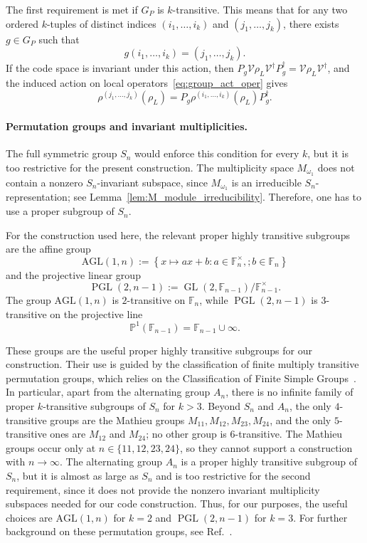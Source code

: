 \documentclass[10pt,twocolumn,superscriptaddress,aps,amsmath,amssymb,citeautoscript,floatfix,prx]{revtex4-2}
\theoremstyle{plain}
\theoremstyle{plain}
\theoremstyle{plain}
\theoremstyle{plain}
\theoremstyle{plain}
\theoremstyle{plain}
\theoremstyle{plain}
\theoremstyle{definition}
\theoremstyle{plain}
\begin{document}
The first requirement is met if $G_P$ is $k$-transitive. This means that for any two ordered $k$-tuples of distinct indices $(i_1,\ldots,i_k)$ and $(j_1,\ldots,j_k)$, 
there exists $g\in G_P$ such that
$$
g(i_1,\ldots,i_k)=(j_1,\ldots,j_k).
$$
If the code space is invariant under this action, then $P_g\mathcal{V}\rho_L\mathcal{V}^\dagger P_g^\dagger=\mathcal{V}\rho_L\mathcal{V}^\dagger$, 
and the induced action on local operators~\eqref{eq:group_act_oper} gives
$$
\rho^{(j_1,\ldots,j_k)}(\rho_L)
=
P_g
\rho^{(i_1,\ldots,i_k)}(\rho_L)
P_g^\dagger .
$$

\paragraph{Permutation groups and invariant multiplicities.}

The full symmetric group $S_n$ would enforce this condition for every $k$, but it is too restrictive for the present construction. 
The multiplicity space $M_{\omega_1}$ does not contain a nonzero $S_n$-invariant subspace, since $M_{\omega_1}$ is an irreducible $S_n$-representation; 
see Lemma~\ref{lem:M_module_irreducibility}. Therefore, one has to use a proper subgroup of $S_n$.

For the construction used here, the relevant proper highly transitive subgroups are the affine group
\begin{equation}\label{eq:AGL_def}
\mathrm{AGL}(1,n)
:=
\left\{
x\mapsto ax+b:
a\in\mathbb F_n^\times,;
b\in\mathbb F_n
\right\}
\end{equation}
and the projective linear group
\begin{equation}\label{eq:PGL_def}
\operatorname{PGL}(2,n-1)
:=
\operatorname{GL}\left(2,\mathbb F_{n-1}\right)
/\mathbb F_{n-1}^\times .
\end{equation}
The group $\mathrm{AGL}(1,n)$ is $2$-transitive on $\mathbb F_n$, while $\operatorname{PGL}(2,n-1)$ is $3$-transitive on the projective line
$$
\mathbb P^1(\mathbb F_{n-1})
=
\mathbb F_{n-1}\cup{\infty}.
$$

These groups are the useful proper highly transitive subgroups for our construction. 
Their use is guided by the classification of finite multiply transitive permutation groups, 
which relies on the Classification of Finite Simple Groups~\cite{GorensteinLyonsSolomon1994}. 
In particular, apart from the alternating group $A_n$, there is no infinite family of proper $k$-transitive subgroups of $S_n$ for $k>3$. Beyond $S_n$ and $A_n$, 
the only $4$-transitive groups are the Mathieu groups $M_{11}, M_{12}, M_{23}, M_{24}$, and the only $5$-transitive ones are $M_{12}$ and $M_{24}$; 
no other group is $6$-transitive. The Mathieu groups occur only at $n\in\{11,12,23,24\}$, so they cannot support a construction with $n\to\infty$. 
The alternating group $A_n$ is a proper highly transitive subgroup of $S_n$, but it is almost as large as $S_n$ and is too restrictive for the second requirement, 
since it does not provide the nonzero invariant multiplicity subspaces needed for our code construction. Thus, for our purposes, the useful choices are $\mathrm{AGL}(1,n)$ 
for $k=2$ and $\operatorname{PGL}(2,n-1)$ for $k=3$. For further background on these permutation groups, see Ref.~\cite{DixonMortimer1996}.
\end{document}

